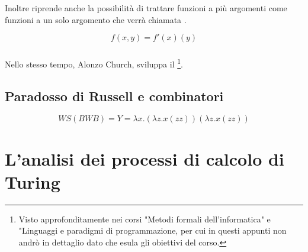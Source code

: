 \subsubsection*{}

Inoltre riprende anche la possibilità di trattare funzioni a più argomenti
come funzioni a un solo argomento che verrà chiamata .

$$f(x, y) = f'(x)(y)$$

\subsubsection*{}

Nello stesso tempo, Alonzo Church, sviluppa il \footnote{Visto approfonditamente nei corsi 
"Metodi formali dell'informatica" e "Linguaggi e paradigmi di programmazione, per cui in questi appunti non andrò
in dettaglio dato che esula gli obiettivi del corso.}.


\subsection{Paradosso di Russell e combinatori}

$$WS(BWB) = Y = \lambda x.(\lambda z.x(zz)) (\lambda z.x(zz))$$



\section{L'analisi dei processi di calcolo di Turing}

